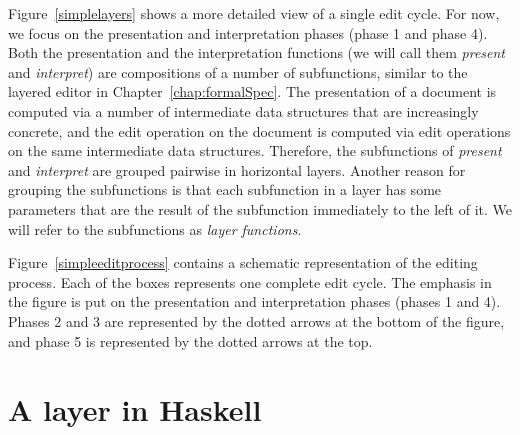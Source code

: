 \documentclass[preprint,natbib]{sigplanconf}
\begin{document}
\bc {}

Figure~\ref{simplelayers}  shows a more detailed view of a single edit cycle. For now, we focus on the presentation and interpretation phases (phase 1 and phase 4). Both the presentation and the interpretation functions (we will call them {\em present} and {\em interpret}) are compositions of a number of subfunctions, similar to the layered editor in Chapter~\ref{chap:formalSpec}. The presentation of a document is computed via a number of intermediate data structures that are increasingly concrete, and the edit operation on the document is computed via edit operations on the same intermediate data structures. Therefore, the subfunctions of {\em present} and {\em interpret} are grouped pairwise in horizontal layers. Another reason for grouping the subfunctions is that each subfunction in a layer has some parameters that are the result of the subfunction immediately to the left of it. We will refer to the subfunctions as {\em layer functions}. \ec


% 



\bc
Figure~\ref{simpleeditprocess} contains a schematic representation of the editing process. Each of the boxes represents one complete edit cycle. The emphasis in the figure is put on the presentation and interpretation phases (phases 1 and 4). Phases 2 and 3 are represented by the dotted arrows at the bottom of the figure, and phase 5 is represented by the dotted arrows at the top.
\ec



%																
%																
%																
\section{A layer in Haskell} \label{sect:layerInHaskell}
\end{document}
